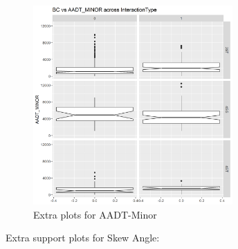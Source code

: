 \documentclass[11pt]{scrartcl} %
\begin{document}
\begin{figure}[H]
\begin{minipage}[t]{0.5\linewidth}
\small
\end{minipage}
\begin{minipage}[t]{0.5\linewidth}
\centering
\includegraphics[width=3in]{image/extra8.png}
\small
\end{minipage}
\caption{Extra plots for AADT-Minor}
\end{figure}

Extra support plots for Skew Angle:
\end{document}
